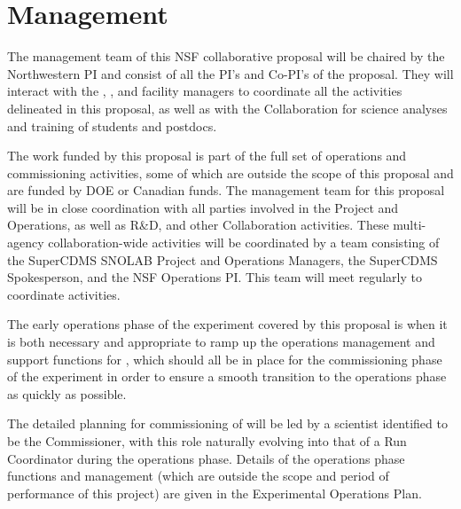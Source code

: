 \section{Management}
\label{sec:management}

The management team of this NSF collaborative proposal will be chaired by the Northwestern PI and consist of all the PI's and Co-PI's of the proposal.  They will interact with the \nexus, \cute, and \SNOLAB facility managers to coordinate all the activities delineated in this proposal, as well as with the \SuperCDMS Collaboration for science analyses and training of students and postdocs.

The work funded by this proposal is part of the full set of \scs operations and commissioning activities, some of which are outside the scope of this proposal and are funded by DOE or Canadian funds. The management team for this proposal will be in close coordination with all parties involved in the \scs Project and Operations, as well as R\&D, and other \SuperCDMS Collaboration activities. These multi-agency collaboration-wide activities will be coordinated by a team consisting of the SuperCDMS SNOLAB Project and Operations Managers, the SuperCDMS Spokesperson, and the NSF Operations PI. This team will meet regularly to coordinate activities. 

The early operations phase of the \scs experiment covered by this proposal is when it is both necessary and appropriate to ramp up the operations management and support functions for \scs, which should all be in place for the commissioning phase of the experiment in order to ensure a smooth transition to the operations phase as quickly as possible.

The detailed planning for commissioning of \scs will be led by a scientist identified to be the \scs Commissioner, with this role naturally evolving into that of a Run Coordinator during the operations phase. Details of the operations phase functions and management (which are outside the scope and period of performance of this project) are given in the \scs Experimental Operations Plan.

